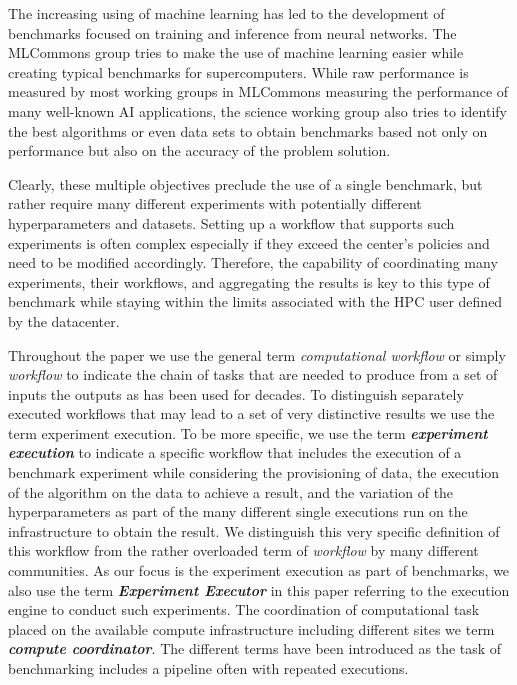 \documentclass[sigconf]{acmart}
\begin{document}
The increasing using of machine learning has led to the development of benchmarks focused on training and inference from neural networks. The MLCommons group tries to make the use of machine learning easier while creating typical benchmarks for supercomputers. While raw performance is measured by most working groups in MLCommons measuring the performance of many well-known AI applications, the science working group also tries to identify the best algorithms or even data sets to obtain benchmarks based not only on performance but also on the accuracy of the problem solution.

Clearly, these multiple objectives preclude the use of a single benchmark, but rather require many different experiments with potentially different hyperparameters and datasets. Setting up a workflow that supports such experiments is often complex especially if they exceed the center's policies and need to be modified accordingly. Therefore, the capability of coordinating many experiments, their workflows, and aggregating the results is key to this type of benchmark while staying within the limits associated with the HPC user defined by the datacenter.

Throughout the paper we use the general term {\em computational workflow} or simply {\em workflow} to indicate the chain of tasks that are needed to produce from a set of inputs the outputs \citep{def-workflow} as has been used for decades. To distinguish separately executed workflows that may lead to a set of very distinctive results we use the term experiment execution. To be more specific, we use the term {\bf\em experiment execution} to indicate a specific workflow that includes the execution of a benchmark experiment while considering the provisioning of data, the execution of the algorithm on the data to achieve a result, and the variation of the hyperparameters as part of the many different single executions run on the infrastructure to obtain the result. We distinguish this very specific definition of this workflow from the rather overloaded term of {\em workflow} by many different communities. As our focus is the experiment execution as part of benchmarks, we also use the term {\bf\em Experiment Executor} in this paper referring to the execution engine to conduct such experiments. The coordination of computational task placed on the available compute infrastructure including different sites we term {\bf\em compute coordinator}. The different terms have been introduced as the task of benchmarking includes a pipeline often with repeated executions. 
\end{document}
